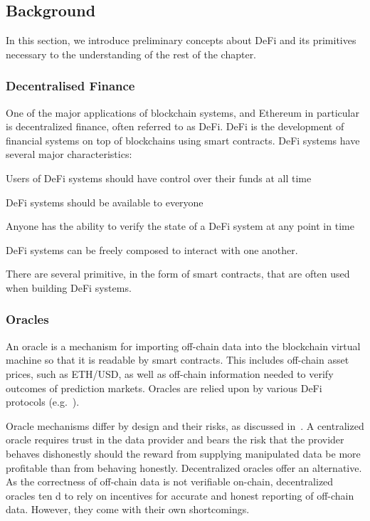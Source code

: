 \subsection{Background}
\label{sec:5b:background}
In this section, we introduce preliminary concepts about DeFi and its primitives necessary to the understanding of the rest of the chapter.

\subsubsection{Decentralised Finance}
One of the major applications of blockchain systems, and Ethereum in particular is decentralized finance, often referred to as DeFi.
DeFi is the development of financial systems on top of blockchains using smart contracts.
DeFi systems have several major characteristics:
\begin{description}
	\setlength{\baselineskip}{15pt}
	\item[Non-custodial] Users of DeFi systems should have control over their funds at all time
	\item[Permisionless] DeFi systems should be available to everyone
	\item[Openly auditable] Anyone has the ability to verify the state of a DeFi system at any point in time
	\item[Composable] DeFi systems can be freely composed to interact with one another.
\end{description}

There are several primitive, in the form of smart contracts, that are often used when building DeFi systems.

\subsubsection{Oracles}
\label{sec:oracles}
An oracle is a mechanism for importing off-chain data into the blockchain virtual machine
so that it is readable by smart contracts.
This includes off-chain asset prices, such as ETH/USD, as well as off-chain information needed to verify outcomes of prediction markets.
Oracles are relied upon by various DeFi protocols (e.g.~\cite{leshner2019compound,whitepaper:aave,whitepaper:maker,synthetix2020litepaper,peterson2015augur,leshner2019compound}).

Oracle mechanisms differ by design and their risks, as discussed in~\cite{Klages-Mundt2020,liu2020look}.
A centralized oracle requires trust in the data provider and bears the risk that the provider behaves dishonestly should the reward from supplying manipulated data be more profitable than from behaving honestly.
Decentralized oracles offer an alternative.
As the correctness of off-chain data is not verifiable on-chain, decentralized oracles ten
d to rely on incentives for accurate and honest reporting of off-chain data.
However, they come with their own shortcomings.


